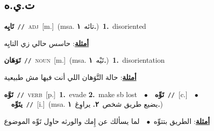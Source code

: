 \documentclass[10pt,a4paper,twoside]{article} %
\begin{document}
\begin{multicols}{2}
\vspace{-3mm}
\subsection*{\color{blue}\foreignlanguage{arabic}{ت.ي.ه}\color{blue}{}} 

{\setlength\topsep{0pt}\textbf{\foreignlanguage{arabic}{تَايِه}}\ {\color{gray}\texttt{//}\color{black}}\ \textsc{adj}\ [m.]\ \color{gray}(msa. \foreignlanguage{arabic}{تائه}~\foreignlanguage{arabic}{\textbf{١.}})\color{black}\ \textbf{1.}~disoriented\  \begin{flushright}\color{gray}\foreignlanguage{arabic}{\textbf{\underline{\foreignlanguage{arabic}{أمثلة}}}: حاسس حالي زي التايِه}\end{flushright}\color{black}} \vspace{2mm}

{\setlength\topsep{0pt}\textbf{\foreignlanguage{arabic}{تَوَهَان}}\ {\color{gray}\texttt{//}\color{black}}\ \textsc{noun}\ [m.]\ \color{gray}(msa. \foreignlanguage{arabic}{تَيْه}~\foreignlanguage{arabic}{\textbf{١.}})\color{black}\ \textbf{1.}~disorientation\  \begin{flushright}\color{gray}\foreignlanguage{arabic}{\textbf{\underline{\foreignlanguage{arabic}{أمثلة}}}: حالة التَّوَهان اللي أنت فيها مش طبيعية}\end{flushright}\color{black}} \vspace{2mm}

{\setlength\topsep{0pt}\textbf{\foreignlanguage{arabic}{تَوَّه}}\ {\color{gray}\texttt{//}\color{black}}\ \textsc{verb}\ [p.]\ \textbf{1.}~evade  \textbf{2.}~make sb lost\ \ $\bullet$\ \ \setlength\topsep{0pt}\textbf{\foreignlanguage{arabic}{تَوِّه}}\ {\color{gray}\texttt{//}\color{black}}\ [c.]\ \ $\bullet$\ \ \setlength\topsep{0pt}\textbf{\foreignlanguage{arabic}{يتَوِّه}}\ {\color{gray}\texttt{//}\color{black}}\ [i.]\ \color{gray}(msa. \foreignlanguage{arabic}{يضيع طريق شخص}~\foreignlanguage{arabic}{\textbf{٢.}}  \foreignlanguage{arabic}{يراوِغ}~\foreignlanguage{arabic}{\textbf{١.}})\color{black}\  \begin{flushright}\color{gray}\foreignlanguage{arabic}{\textbf{\underline{\foreignlanguage{arabic}{أمثلة}}}: الطريق بتتوِّه\ $\bullet$\ \  لما يسألك عن إِمك والورثه حاوِل تَوِّه الموضوع}\end{flushright}\color{black}} \vspace{2mm}

\end{multicols}
\end{document}
